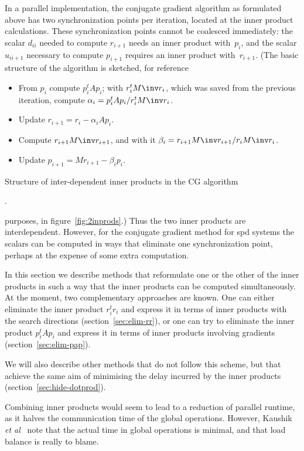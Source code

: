 \documentclass[11pt]{artikel3}
\begin{document}
\begin{Outline}
In a parallel implementation, the conjugate gradient algorithm as
formulated above has two synchronization points per iteration, located
at the inner product calculations. These synchronization points cannot
be coalesced immediately: the scalar $d_{ii}$
needed to compute $r_{i+1}$ needs an inner product with~$p_i$,
and the scalar $u_{ii+1}$
necessary to compute $p_{i+1}$ requires an inner product
with~$r_{i+1}$. 
(The basic structure of the algorithm is sketched, for reference
\begin{rfigure}
\begin{itemize}
\item From $p_i$ compute $p_i^tAp_i$; 
with $r_i^tM\inv r_i$, which was saved from the previous iteration, 
compute $\alpha_i = p_i^tAp_i/r_i^tM\inv r_i$.
\item Update $r_{i+1}=r_i-\alpha_i Ap_i$.
\item Compute $r_{i+1}M\inv r_{i+1}$,
and with it $\beta_i=r_{i+1}M\inv r_{i+1}/r_iM\inv r_i$.
\item Update $p_{i+1}=Mr_{i+1}-\beta_ip_i$.
\end{itemize}
\caption{Structure of inter-dependent inner products in the CG algorithm}.
\label{fig:2inprods}
\end{rfigure}
purposes, in figure~\ref{fig:2inprods}.)
Thus the two inner products are interdependent.
However, for the conjugate gradient method for spd systems the scalars
can be computed in ways that eliminate one synchronization point,
perhaps at
the expense of some extra computation. 

In this section we describe methods that reformulate one or the other
of the inner products in such a way that the inner products can be
computed simultaneously.  At the moment, two complementary approaches
are known. One can either eliminate the inner product $r_i^tr_i$ and
express it in terms of inner products with the search directions
(section~\ref{sec:elim-rr}), or one can try to eliminate the inner
product $p_i^tAp_i$ and express it in terms of inner products
involving gradients (section~\ref{sec:elim-pap}).

We will also describe other methods that do not follow this scheme,
but that achieve the same aim of minimising the delay incurred by the
inner products (section~\ref{sec:hide-dotprod}).

Combining inner products would seem to lead to a reduction of parallel
runtime, as it halves the communication time of the global
operations. However, Kaushik \emph{et
  al}~\cite{KaushikKeyesSmith:interaction} note that the actual time
in global operations is minimal, and that load balance is really to
blame.


\end{Outline}
\end{document}
